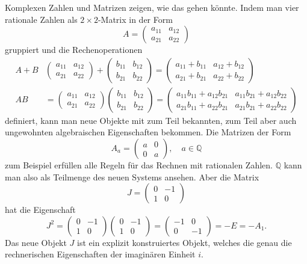 Komplexen Zahlen und Matrizen zeigen, wie das gehen könnte.
Indem man vier rationale Zahlen als $2\times 2$-Matrix in der Form
\[
A=
\begin{pmatrix}
a_{11}&a_{12}\\
a_{21}&a_{22}
\end{pmatrix}
\]
gruppiert und die Rechenoperationen
\begin{align*}
A+B
&
\begin{pmatrix}
a_{11}&a_{12}\\
a_{21}&a_{22}
\end{pmatrix}
+
\begin{pmatrix}
b_{11}&b_{12}\\
b_{21}&b_{22}
\end{pmatrix}
=
\begin{pmatrix}
a_{11}+b_{11}&a_{12}+b_{12}\\
a_{21}+b_{21}&a_{22}+b_{22}
\end{pmatrix}
\\
AB
&=
\begin{pmatrix}
a_{11}&a_{12}\\
a_{21}&a_{22}
\end{pmatrix}
\begin{pmatrix}
b_{11}&b_{12}\\
b_{21}&b_{22}
\end{pmatrix}
=
\begin{pmatrix}
a_{11}b_{11} + a_{12}b_{21} & a_{11}b_{21} + a_{12}b_{22} \\
a_{21}b_{11} + a_{22}b_{21} & a_{21}b_{21} + a_{22}b_{22} 
\end{pmatrix}
\end{align*}
definiert, kann man neue Objekte mit zum Teil bekannten, zum Teil
aber auch ungewohnten algebraischen Eigenschaften bekommen.
Die Matrizen der Form
\[
A_a
=
\begin{pmatrix} a&0\\0&a \end{pmatrix},
\quad
a\in\mathbb{Q}
\]
zum Beispiel erfüllen alle Regeln für das Rechnen mit rationalen Zahlen.
$\mathbb{Q}$ kann man also als Teilmenge des neuen Systems ansehen.
Aber die Matrix
\[
J
=
\begin{pmatrix} 0&-1\\1&0 \end{pmatrix}
\]
hat die Eigenschaft
\[
J^2 = 
\begin{pmatrix} 0&-1\\1&0 \end{pmatrix}
\begin{pmatrix} 0&-1\\1&0 \end{pmatrix}
=
\begin{pmatrix} -1&0\\0&-1\end{pmatrix}
=
-E = -A_1.
\]
Das neue Objekt $J$ ist ein explizit konstruiertes Objekt, welches
die genau die rechnerischen Eigenschaften der imaginären Einheit $i$.

